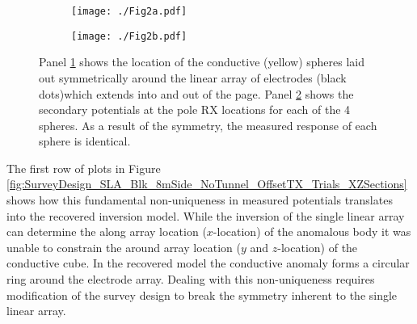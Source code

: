 \documentclass[preprint,authoryear,12pt]{elsarticle}
\providecommand{\DIFaddtex}[1]{{\protect\color{blue}\uwave{#1}}} %
\providecommand{\DIFdelbegin}{} %
\providecommand{\DIFaddFL}[1]{\DIFadd{#1}} %
\providecommand{\DIFaddbeginFL}{} %
\providecommand{\DIFaddendFL}{} %
\providecommand{\DIFdelbeginFL}{} %
\providecommand{\DIFdelendFL}{} %
\providecommand{\DIFadd}[1]{\texorpdfstring{\DIFaddtex{#1}}{#1}} %
\begin{document}
\begin{figure}[htp]
   \begin{center}
      \begin{subfigure}{0.4\linewidth}
         \DIFdelbeginFL %
\DIFdelendFL \DIFaddbeginFL \texttt{[image: ./Fig2a.pdf]}
         \DIFaddendFL \caption{}
         \label{fig:4Spheres_Symmetric_Model}
      \end{subfigure}
      \hfill
      \begin{subfigure}{0.59\linewidth}
         \DIFdelbeginFL %
\DIFdelendFL \DIFaddbeginFL \texttt{[image: ./Fig2b.pdf]}
         \DIFaddendFL \caption{}
         \label{fig:4Spheres_Symmetric_Vs}
      \end{subfigure}
   \end{center}
\caption{Panel \ref{fig:4Spheres_Symmetric_Model} shows the location of the conductive (yellow) spheres laid out symmetrically around the linear array of electrodes (black dots)\DIFaddbeginFL \DIFaddFL{, }\DIFaddendFL which extends into and out of the page. Panel \ref{fig:4Spheres_Symmetric_Vs} shows the secondary potentials at the pole RX locations for each of the 4 spheres. As a result of the symmetry, the measured response of each sphere is identical.}
\label{fig:4Spheres_Symmetric}
\end{figure}


The first row of plots in Figure \ref{fig:SurveyDesign_SLA_Blk_8mSide_NoTunnel_OffsetTX_Trials_XZSections} shows how this fundamental non-uniqueness in measured potentials translates into the recovered inversion model. While the inversion of the single linear array can determine the along array location ($x$-location) of the anomalous body it was unable to constrain the around array location ($y$ and $z$-location) of the conductive cube. In the recovered model the conductive anomaly forms a circular ring around the electrode array. Dealing with this non-uniqueness requires modification of the survey design to break the symmetry inherent to the single linear array.


\DIFdelbegin %
\end{document}
